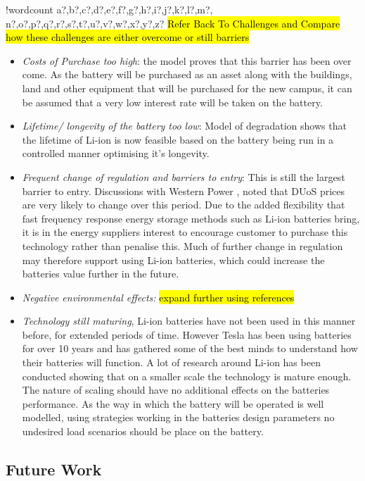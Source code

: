 \documentclass[fontsize=9.5pt]{extarticle}
\numberwithin{figure}{section} %
\providecommand{\tightlist}{%
  \setlength{\itemsep}{0pt}\setlength{\parskip}{0pt}}
\newcounter{words}
\newenvironment{counted}{%
  \setcounter{words}{0}
  \SearchList!{wordcount}{\stepcounter{words}}
    {a?,b?,c?,d?,e?,f?,g?,h?,i?,j?,k?,l?,m?,
    n?,o?,p?,q?,r?,s?,t?,u?,v?,w?,x?,y?,z?}
  \UndoBoundary{'}
  \SearchOrder{p;}}{%
  \StopSearching}
\begin{document}
\begin{counted}
\hl{Refer Back To Challenges and Compare how these challenges are either overcome or still barriers}

\begin{itemize}
\tightlist
\item
  \emph{Costs of Purchase too high}: the model proves that this barrier
  has been over come. As the battery will be purchased as an asset along
  with the buildings, land and other equipment that will be purchased
  for the new campus, it can be assumed that a very low interest rate
  will be taken on the battery.
\item
  \emph{Lifetime/ longevity of the battery too low}: Model of
  degradation shows that the lifetime of Li-ion is now feasible based on
  the battery being run in a controlled manner optimising it's
  longevity.
\item
  \emph{Frequent change of regulation and barriers to entry}: This is
  still the largest barrier to entry. Discussions with Western Power
  \cite{wpMWMD}, noted that DUoS prices are very likely to change over
  this period. Due to the added flexibility that fast frequency response
  energy storage methods such as Li-ion batteries bring, it is in the
  energy suppliers interest to encourage customer to purchase this
  technology rather than penalise this. Much of further change in
  regulation may therefore support using Li-ion batteries, which could
  increase the batteries value further in the future.
\item
  \emph{Negative environmental effects:}
  \hl{expand further using references } \cite{daniels2013financial}
\item
  \emph{Technology still maturing}, Li-ion batteries have not been used
  in this manner before, for extended periods of time. However Tesla has
  been using batteries for over 10 years and has gathered some of the
  best minds to understand how their batteries will function. A lot of
  research around Li-ion has been conducted showing that on a smaller
  scale the technology is mature enough. The nature of scaling should
  have no additional effects on the batteries performance. As the way in
  which the battery will be operated is well modelled, using strategies
  working in the batteries design parameters no undesired load scenarios
  should be place on the battery.
\end{itemize}

\subsection{Future Work}\label{future-work}


\end{counted}
\end{document}
